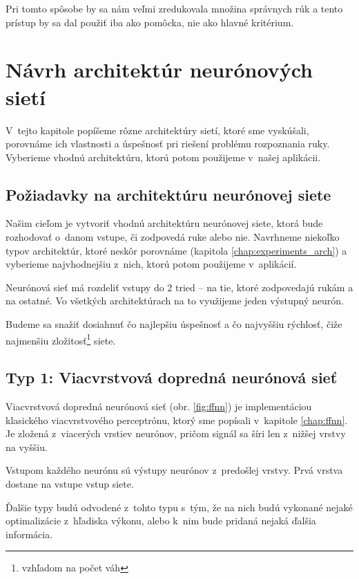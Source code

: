 Pri tomto spôsobe by sa nám veľmi zredukovala množina správnych rúk a tento prístup by sa dal použiť iba ako pomôcka, nie ako hlavné kritérium.

\section{Návrh architektúr neurónových sietí}\label{chap:neuralnetarch}

V~tejto kapitole popíšeme rôzne architektúry sietí, ktoré sme vyskúšali, porovnáme ich vlastnosti a úspešnosť pri riešení problému rozpoznania ruky. Vyberieme vhodnú architektúru, ktorú potom použijeme v~našej aplikácii.

\subsection{Požiadavky na architektúru neurónovej siete}

Našim cieľom je vytvoriť vhodnú architektúru neurónovej siete, ktorá bude rozhodovať o~danom vstupe, či zodpovedá ruke alebo nie. 
Navrhneme niekoľko typov architektúr, ktoré neskôr porovnáme (kapitola \ref{chap:experiments_arch}) a vyberieme najvhodnejšiu z~nich, ktorú potom použijeme v~aplikácií. 

Neurónová sieť má rozdeliť vstupy do 2 tried -- na tie, ktoré zodpovedajú rukám a na ostatné. Vo všetkých architektúrach na to využijeme jeden výstupný neurón.

Budeme sa snažiť dosiahnuť čo najlepšiu úspešnosť a čo najvyššiu rýchlosť, čiže najmenšiu zložitosť\footnote{vzhľadom na počet váh} siete.

\subsection{Typ 1: Viacvrstvová dopredná neurónová sieť}

Viacvrstvová dopredná neurónová sieť (obr. \ref{fig:ffnn}) je implementáciou klasického viacvrstvového perceptrónu, ktorý sme popísali v~kapitole \ref{chap:ffnn}. Je zložená z~viacerých vrstiev neurónov, pričom signál sa šíri len z~nižšej vrstvy na vyššiu.

Vstupom každého neurónu sú výstupy neurónov z~predošlej vrstvy. Prvá vrstva dostane na vstupe vstup siete. 

Ďalšie typy budú odvodené z~tohto typu s~tým, že na nich budú vykonané nejaké optimalizácie z~hľadiska výkonu, alebo k~nim bude pridaná nejaká ďalšia informácia.

